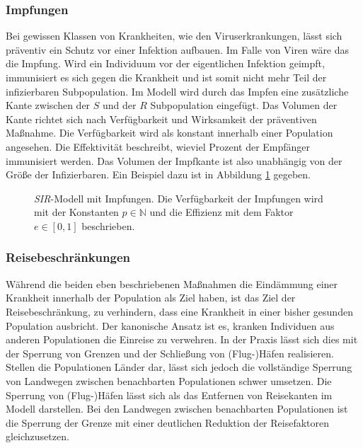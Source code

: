 \subsubsection{Impfungen}\steffen
Bei gewissen Klassen von Krankheiten, wie den Viruserkrankungen, lässt sich präventiv ein Schutz vor einer Infektion aufbauen. Im Falle von Viren wäre das die Impfung. Wird ein Individuum vor der eigentlichen Infektion geimpft, immunisiert es sich gegen die Krankheit und ist somit nicht mehr Teil der infizierbaren Subpopulation. Im Modell wird durch das Impfen eine zusätzliche Kante zwischen der $S$ und der $R$ Subpopulation eingefügt. Das Volumen der Kante richtet sich nach Verfügbarkeit und Wirksamkeit der präventiven Maßnahme. Die Verfügbarkeit wird als konstant innerhalb einer Population angesehen. Die Effektivität beschreibt, wieviel Prozent der Empfänger immunisiert werden. Das Volumen der Impfkante ist also unabhängig von der Größe der Infizierbaren. Ein Beispiel dazu ist in Abbildung \ref{fig:ssec:actions:vac} gegeben.
\begin{figure}
\begin{center}
\end{center}
\caption{\emph{SIR}-Modell mit Impfungen. Die Verfügbarkeit der Impfungen wird mit der Konstanten $p\in\mathbb{N}$ und die Effizienz mit dem Faktor $e\in[0,1]$ beschrieben.}\label{fig:ssec:actions:vac}
\end{figure}


\subsubsection{Reisebeschränkungen}\steffen
Während die beiden eben beschriebenen Maßnahmen die Eindämmung einer Krankheit innerhalb der Population als Ziel haben, ist das Ziel der Reisebeschränkung, zu verhindern, dass eine Krankheit in einer bisher gesunden Population ausbricht. Der kanonische Ansatz ist es, kranken Individuen aus anderen Populationen die Einreise zu verwehren. In der Praxis lässt sich dies mit der Sperrung von Grenzen und der Schließung von (Flug-)Häfen realisieren. Stellen die Populationen Länder dar, lässt sich jedoch die vollständige Sperrung von Landwegen zwischen benachbarten Populationen schwer umsetzen. Die Sperrung von (Flug-)Häfen lässt sich als das Entfernen von Reisekanten im Modell darstellen. Bei den Landwegen zwischen benachbarten Populationen ist die Sperrung der Grenze mit einer deutlichen Reduktion der Reisefaktoren gleichzusetzen. 

